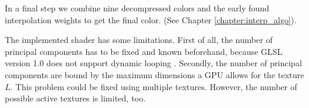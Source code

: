 In a final step we combine nine decompressed colors and the early found interpolation weights to get the final color. (See Chapter \ref{chapter:interp_algo}).

The implemented shader has some limitations. First of all, the number of principal components has to be fixed and known beforehand, because GLSL version 1.0 does not support dynamic looping \cite{glsl}.
Secondly, the number of principal components are bound by the maximum dimensions a GPU allows for the texture $L$.
This problem could be fixed using multiple textures. However, the number of possible active textures is limited, too.






 



